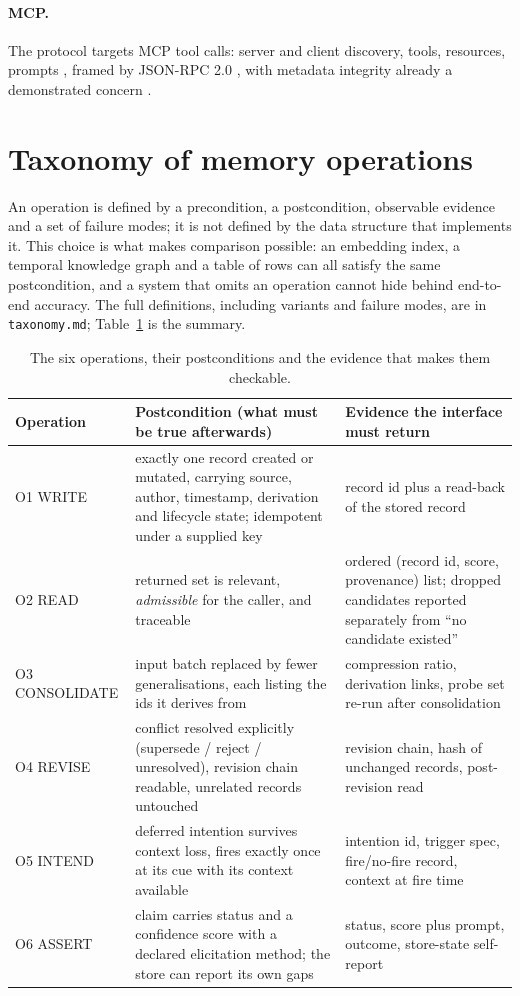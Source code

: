 \documentclass[11pt,a4paper]{article}
\begin{document}
\paragraph{MCP.} The protocol targets MCP tool calls: server and client discovery, tools,
resources, prompts \cite{mcpspec2025}, framed by JSON-RPC 2.0 \cite{jsonrpc2}, with metadata
integrity already a demonstrated concern \cite{rashidi2026unicode}.

\section{Taxonomy of memory operations}
\label{sec:taxonomy}

An operation is defined by a precondition, a postcondition, observable evidence and a set of
failure modes; it is not defined by the data structure that implements it. This choice is what
makes comparison possible: an embedding index, a temporal knowledge graph
\cite{rasmussen2025zep,graphiti} and a table of rows can all satisfy the same postcondition, and
a system that omits an operation cannot hide behind end-to-end accuracy. The full definitions,
including variants and failure modes, are in \texttt{taxonomy.md}; Table~\ref{tab:ops} is the
summary.

\begin{table}[t]
\centering
\small
\begin{tabular}{@{}p{2.1cm}p{6.4cm}p{5.6cm}@{}}
\toprule
Operation & Postcondition (what must be true afterwards) & Evidence the interface must return \\
\midrule
O1 WRITE & exactly one record created or mutated, carrying source, author, timestamp,
derivation and lifecycle state; idempotent under a supplied key & record id plus a read-back of
the stored record \\
O2 READ & returned set is relevant, \emph{admissible} for the caller, and traceable & ordered
(record id, score, provenance) list; dropped candidates reported separately from ``no candidate
existed'' \\
O3 CONSOLIDATE & input batch replaced by fewer generalisations, each listing the ids it derives
from & compression ratio, derivation links, probe set re-run after consolidation \\
O4 REVISE & conflict resolved explicitly (supersede / reject / unresolved), revision chain
readable, unrelated records untouched & revision chain, hash of unchanged records, post-revision
read \\
O5 INTEND & deferred intention survives context loss, fires exactly once at its cue with its
context available & intention id, trigger spec, fire/no-fire record, context at fire time \\
O6 ASSERT & claim carries status and a confidence score with a declared elicitation method; the
store can report its own gaps & status, score plus prompt, outcome, store-state self-report \\
\bottomrule
\end{tabular}
\caption{The six operations, their postconditions and the evidence that makes them checkable.}
\label{tab:ops}
\end{table}
\end{document}
